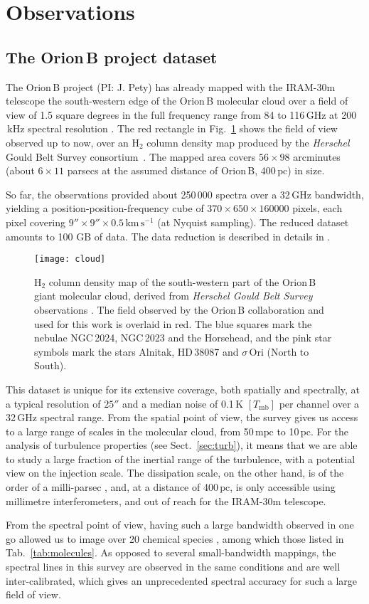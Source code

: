 \documentclass[structabstract]{aa}
\newcommand{\emm}[1]{\ensuremath{#1}}
\newcommand{\emr}[1]{\emm{\mathrm{#1}}}
\newcommand{\unit}[1]{\emr{\,#1}}
\newcommand{\kHz}{\unit{kHz}}
\newcommand{\GHz}{\unit{GHz}}
\newcommand{\pc}{\unit{pc}}
\newcommand{\mpc}{\unit{mpc}}
\newcommand{\K}{\unit{K}}
\newcommand{\kms}{\unit{km\,s^{-1}}}
\newcommand{\FigCloud}{%
  \begin{figure}
    \centering
    \texttt{[image: cloud]}
    \caption{H$_2$ column density map of the south-western part of the Orion\,B giant molecular cloud, derived from \emph{Herschel Gould Belt Survey} observations \citep{andre10,schneider13}. The field observed by the Orion\,B collaboration and used for this work is overlaid in red. The blue squares mark the nebulae NGC\,2024, NGC\,2023 and the Horsehead, and the pink star symbols mark the stars Alnitak, HD\,38087 and $\sigma$\,Ori (North to South).}
    \label{fig:cloud}
  \end{figure}}
\begin{document}
\section{Observations}
\subsection{The Orion\,B project dataset}
The Orion\,B project (PI: J. Pety) has already mapped with the IRAM-30m telescope the south-western edge of the Orion\,B molecular cloud over a field of view of 1.5 square degrees in the full frequency range from 84 to 116\GHz{} at 200\kHz{} spectral resolution \citep{pety16}. The red rectangle in Fig.~\ref{fig:cloud} shows the field of view observed up to now, over an H$_2$ column density map produced by the \emph{Herschel} Gould Belt Survey consortium~\citep{andre10,schneider13}. The mapped area covers $56 \times 98$ arcminutes (about $6 \times 11$ parsecs at the assumed distance of Orion\,B, 400\pc{}) in size.

So far, the observations provided about 250\,000 spectra over a 32\GHz{} bandwidth, yielding a position-position-frequency cube of $370 \times 650 \times 160000$ pixels, each pixel covering $9'' \times 9'' \times 0.5$\kms{} (at Nyquist sampling). The reduced dataset amounts to 100 GB of data. The data reduction is described in details in \citet{pety16}. 

\FigCloud{} %

This dataset is unique for its extensive coverage, both spatially and spectrally, at a typical resolution of $25''$ and a median noise of 0.1\K{} $[T_{\emr{mb}}]$ per channel over a 32\GHz{} spectral range. From the spatial point of view, the survey gives us access to a large range of scales in the molecular cloud, from 50\mpc{} to 10\pc{}. For the analysis of turbulence properties (see Sect.~\ref{sec:turb}), it means that we are able to study a large fraction of the inertial range of the turbulence, with a potential view on the injection scale. The dissipation scale, on the other hand, is of the order of a milli-parsec \citep{hennebelle12,miville16}, and, at a distance of 400\pc{}, is only accessible using millimetre interferometers, and out of reach for the IRAM-30m telescope.

From the spectral point of view, having such a large bandwidth observed in one go allowed us to image over 20 chemical species \citep{pety16}, among which those listed in Tab.~\ref{tab:molecules}. As opposed to several small-bandwidth mappings, the spectral lines in this survey are observed in the same conditions and are well inter-calibrated, which gives an unprecedented spectral accuracy for such a large field of view.
\end{document}
